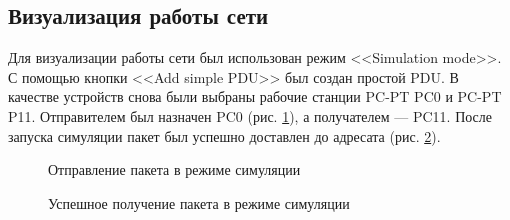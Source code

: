 \documentclass[a4paper, 14pt]{extarticle}
\begin{document}
\subsection{Визуализация работы сети}

Для визуализации работы сети был использован режим <<Simulation mode>>. С
помощью кнопки <<Add simple PDU>> был создан простой PDU. В качестве устройств
снова были выбраны рабочие станции PC-PT PC0 и PC-PT P11. Отправителем был
назначен PC0 (рис. \ref{fig:visualization/reachable/start.png}), а получателем
--- PC11. После запуска симуляции пакет был успешно доставлен до адресата (рис.
\ref{fig:visualization/reachable/end.png}).

\begin{figure}[H]
  \centering
  \caption{Отправление пакета в режиме симуляции}
  \label{fig:visualization/reachable/start.png}
\end{figure}

\begin{figure}[H]
  \centering
  \caption{Успешное получение пакета в режиме симуляции}
  \label{fig:visualization/reachable/end.png}
\end{figure}
\end{document}
